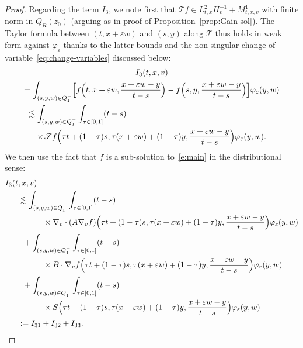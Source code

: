 \documentclass[10pt]{amsart}
\let\mathcal\mathscr
\theoremstyle{definition}
\theoremstyle{remark}
\newcommand{\cT}{\mathcal T}
\let\var\varepsilon
\begin{document}
\begin{proof}
Regarding the term $I_3$, we note first that
$\cT f \in L^2_{t,x} H^{-1}_v + M^1_{t,x,v}$ with finite norm
in $Q_R(z_0)$ (arguing as in proof of
Proposition~\ref{prop:Gain sol}). The Taylor formula between
$(t,x+\varepsilon w)$ and $(s,y)$ along $\cT$ thus holds in
weak form against $\varphi_\var$ thanks to the latter bounds
and the non-singular change of
variable~\eqref{eq:change-variables} discussed below:\vspace*{-5pt}
\begin{multline}\label{eq:Taylor-weak}
I_3(t,x,v)\\
= \int_{(s,y,w)\in Q_1^{-}} \Bigl[
f\Bigl(t,x+\varepsilon w,\frac{x+\varepsilon w
-y}{t-s}\Bigr)-f\Bigl(s,y,\frac{x+\varepsilon w
-y}{t-s}\Bigr)\Bigr] \varphi_\var(y,w)\\
\shoveleft{\hspace*{-1mm}\lesssim \int_{(s,y,w)\in Q_1^{-}} \int_{\tau \in
[0,1]} (t-s)}\\
\times \cT
f\Bigl(\tau t+(1-\tau)s,\tau (x+\varepsilon
w)+(1-\tau)y,\frac{x+\varepsilon w
-y}{t-s}\Bigr)\varphi_\var(y,w).
\end{multline}
We then use the fact that $f$ is a sub-solution
to~\eqref{e:main} in the distributional sense:\vspace*{-5pt}
\begin{align*}
I_3(t&,x,v)\\
&\lesssim \int_{(s,y,w)\in Q_1^{-}} \int_{\tau \in
[0,1]} (t-s) \\
&\hspace*{1.1cm}\times \nabla_v \cdot (A \nabla_v f)\Bigl(\tau
t+(1-\tau)s,\tau (x+\varepsilon
w)+(1-\tau)y,\frac{x+\varepsilon w
-y}{t-s}\Bigr)\varphi_\var(y,w)\\
&\hspace*{.2cm}+\int_{(s,y,w)\in Q_1^{-}} \int_{\tau \in
[0,1]} (t-s) \\
&\hspace*{1.1cm}\times
B\cdot \nabla_v f\Bigl(\tau t+(1-\tau)s,\tau
(x+\varepsilon w)+(1-\tau)y,\frac{x+\varepsilon w
-y}{t-s}\Bigr)\varphi_\var(y,w)\\
&\hspace*{.2cm}+ \int_{(s,y,w)\in Q_1^{-}} \int_{\tau \in
[0,1]} (t-s) \\
&\hspace*{1.1cm}\times S\Bigl(\tau t+(1-\tau)s,\tau (x+\varepsilon
w)+(1-\tau)y,\frac{x+\varepsilon w
-y}{t-s}\Bigr)\varphi_\var(y,w)\\
&:= I_{31}+I_{32}+I_{33}.
\end{align*}

\end{proof}
\end{document}
